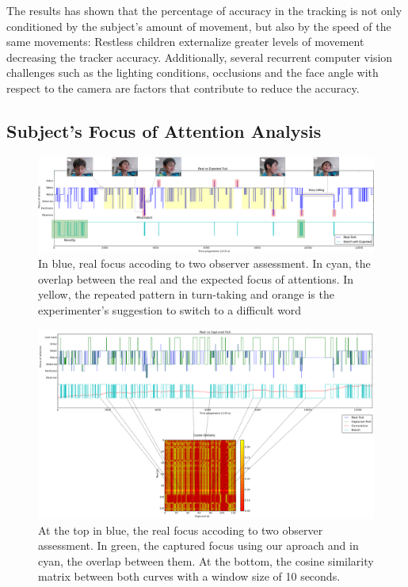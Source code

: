 \documentclass{sig-alternate}
\begin{document}
The results has shown that the percentage of accuracy in the tracking is not only conditioned by the subject's amount of movement, but also by the speed of the same movements: Restless children externalize greater levels of movement decreasing the tracker accuracy. Additionally, several recurrent computer vision challenges such as the lighting conditions, occlusions and the face angle with respect to the camera are factors that contribute to reduce the accuracy.

\subsection{Subject's Focus of Attention Analysis}


\begin{figure}
    \centering
    \includegraphics[width=2\columnwidth]{realExpected}
    \caption{\small In blue, real focus accoding to two observer assessment. In cyan, the overlap between the real and the expected focus of attentions. In yellow, the repeated pattern in turn-taking and orange is the experimenter's suggestion to switch to a difficult word}
    \label{fig:realExpected}
    
\end{figure}


\begin{figure}
    \centering
    \includegraphics[width=2\columnwidth]{bitmap_zoom}
    \caption{\small At the top in blue, the real focus accoding to two observer assessment. In green, the captured focus using our aproach and in cyan, the overlap between them. At the bottom, the cosine similarity matrix between both curves with a window size of 10 seconds.}
    \label{fig:realCaptured}
\end{figure}
\end{document}
